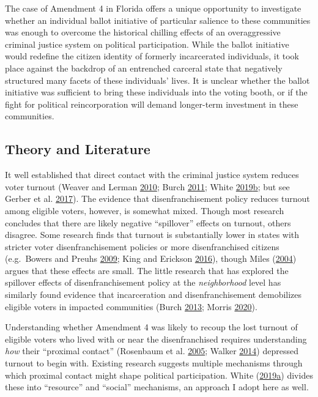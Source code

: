 \documentclass[
  12pt,
]{article}
\begin{document}
The case of Amendment 4 in Florida offers a unique opportunity to investigate whether an individual ballot initiative of particular salience to these communities was enough to overcome the historical chilling effects of an overaggressive criminal justice system on political participation. While the ballot initiative would redefine the citizen identity of formerly incarcerated individuals, it took place against the backdrop of an entrenched carceral state that negatively structured many facets of these individuals' lives. It is unclear whether the ballot initiative was sufficient to bring these individuals into the voting booth, or if the fight for political reincorporation will demand longer-term investment in these communities.

\hypertarget{theory-and-literature}{%
\subsection*{Theory and Literature}\label{theory-and-literature}}

It well established that direct contact with the criminal justice system reduces voter turnout (Weaver and Lerman \protect\hyperlink{ref-Weaver2010}{2010}; Burch \protect\hyperlink{ref-Burch2011}{2011}; White \protect\hyperlink{ref-White2019}{2019}\protect\hyperlink{ref-White2019}{b}; but see Gerber et al. \protect\hyperlink{ref-Gerber2017}{2017}). The evidence that disenfranchisement policy reduces turnout among eligible voters, however, is somewhat mixed. Though most research concludes that there are likely negative ``spillover'' effects on turnout, others disagree. Some research finds that turnout is substantially lower in states with stricter voter disenfranchisement policies or more disenfranchised citizens (e.g.~Bowers and Preuhs \protect\hyperlink{ref-Bowers2009}{2009}; King and Erickson \protect\hyperlink{ref-King2016}{2016}), though Miles (\protect\hyperlink{ref-Miles2004}{2004}) argues that these effects are small. The little research that has explored the spillover effects of disenfranchisement policy at the \emph{neighborhood} level has similarly found evidence that incarceration and disenfranchisement demobilizes eligible voters in impacted communities (Burch \protect\hyperlink{ref-Burch2013}{2013}; Morris \protect\hyperlink{ref-Morris2020}{2020}).

Understanding whether Amendment 4 was likely to recoup the lost turnout of eligible voters who lived with or near the disenfranchised requires understanding \emph{how} their ``proximal contact'' (Rosenbaum et al. \protect\hyperlink{ref-Rosenbaum2005}{2005}; Walker \protect\hyperlink{ref-Walker2014}{2014}) depressed turnout to begin with. Existing research suggests multiple mechanisms through which proximal contact might shape political participation. White (\protect\hyperlink{ref-White2019a}{2019}\protect\hyperlink{ref-White2019a}{a}) divides these into ``resource'' and ``social'' mechanisms, an approach I adopt here as well.
\end{document}
